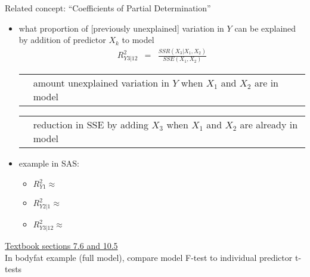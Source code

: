 \documentclass[12pt]{notes}
\begin{document}
Related concept: ``Coefficients of Partial Determination''
\begin{itemize}
  \item what proportion of [previously unexplained] variation in $Y$
  can be explained by addition of predictor $X_k$ to model
    \begin{eqnarray}
      R^2_{Y3|12} & = & \frac{SSR(X_3 | X_1, X_2)}{SSE(X_1,X_2)}
      \nonumber
    \end{eqnarray}
    \vspace{3em}
    
    \begin{tabular}{l l}
    \hspace{4em} &
    \begin{minipage}[t]{2.5in}
      \vspace{-5em}
    
      amount unexplained variation in $Y$ when $X_1$ and $X_2$ are in model
    \end{minipage}
    \end{tabular}
   
      \begin{tabular}{l l}
    \hspace{26em} &
    \begin{minipage}[t]{2.5in}
      \vspace{-10em}

      reduction in SSE by adding $X_3$ when $X_1$ and $X_2$ are already in model
    \end{minipage}
    \end{tabular}

\vspace{-5.5em}
    
  \item example in SAS:
    \begin{itemize}
       \item $R^2_{Y1} \approx$
       \item $R^2_{Y2|1} \approx$
       \item $R^2_{Y3|12} \approx$
    \end{itemize}
\end{itemize}

\newpage

\underline{Textbook sections 7.6 and 10.5}\\

In bodyfat example (full model), compare model F-test to
individual predictor t-tests\\

\vspace{1em}













\end{document}
